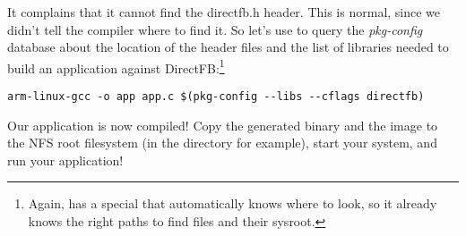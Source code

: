It complains that it cannot find the directfb.h header. This is
normal, since we didn't tell the compiler where to find it. So let's
use  to query the {\em pkg-config} database about the
location of the header files and the list of libraries needed to build
an application against DirectFB:\footnote{Again,
 has a special  that
automatically knows where to look, so it already knows the right paths
to find  files and their sysroot.}

\footnotesize
\begin{verbatim}
arm-linux-gcc -o app app.c $(pkg-config --libs --cflags directfb)
\end{verbatim}
\normalsize

Our application is now compiled! Copy the generated binary and the
 image to the NFS root filesystem (in the
 directory for example), start your system, and run your
application!
